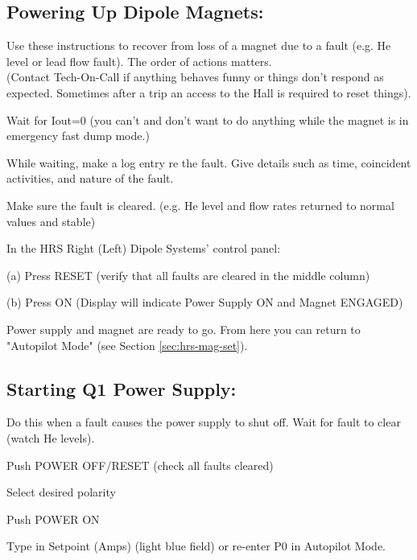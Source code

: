 {\subsection{Powering Up Dipole Magnets:}

Use these instructions to recover from loss of a magnet due to a fault
(e.g. He level or lead flow fault). The order of actions matters. \\
(Contact Tech-On-Call if anything behaves funny or things don't
respond as expected. Sometimes after a trip an access to the Hall is
required to reset things).

\begin{list}{.~}{\setlength{\itemsep}{-0.15cm}}
   \item Wait for Iout=0 (you can't and don't want to do anything while the magnet is in emergency fast dump mode.)
   \item While waiting, make a log entry re the fault. Give details such as time, coincident activities, and nature of the fault.
   \item Make sure the fault is cleared. (e.g. He level and flow rates returned to normal values and stable)
   \item In the HRS Right (Left) Dipole Systems' control panel:
   \begin{list}{}{\setlength{\itemsep}{-0.15cm}}
      \item[(a)] Press RESET (verify that all faults are cleared in the middle column)
      \item[(b)] Press ON (Display will indicate Power Supply ON and Magnet ENGAGED)
   \end{list}
\end{list}


Power supply and magnet are ready to go. From here you can return 
to "Autopilot Mode" (see Section \ref{sec:hrs-mag-set}).

\subsection{Starting Q1 Power Supply:}

 Do this when a fault causes the power supply to shut off.
 Wait for fault to clear (watch He levels). 
\begin{list}{.~}{\setlength{\itemsep}{-0.15cm}}
   \item Push POWER OFF/RESET (check all faults cleared)
   \item Select desired polarity
   \item Push POWER ON
   \item Type in Setpoint (Amps) (light blue field) or re-enter P0 in Autopilot Mode.
\end{list}

}
